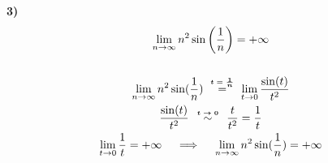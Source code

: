 \documentclass[11pt,reqno]{amsart}
\begin{document}
{\bf 3)}
\begin{gather*}
 \lim_{n \to \infty} n^2 \sin\left(\frac{1}{n}\right) = +\infty\\\\
 \iffalse \text{Osserviamo che} \quad \lim_{x \to 0} \frac{\sin(x)}{x} = 1\\
 \text{quindi} \quad \forall \, \epsilon > 0 \quad \exists \, \overline{n}: \quad \forall \, \frac{1}{n} \leq \overline{n} \quad \left|\frac{\sin(\frac{1}{n})}{\frac{1}{n}} - 1\right| < \epsilon\\
 \implies \quad 1 - \epsilon < \frac{\sin(\frac{1}{n})}{\frac{1}{n}} < 1 + \epsilon\\
 \text{Consideriamo la parte } \textbf{sinistra} \text{ della doppia disuguaglianza, e prendiamo } \epsilon = \frac{1}{2}\\
 \implies \quad \frac{\sin(\frac{1}{n})}{\frac{1}{n}} > \frac{1}{2} \quad \text{per} \quad \frac{1}{n} \leq \overline{n}_{\epsilon = \frac{1}{2}} \quad \left(\text{quindi per } n \geq \frac{1}{\overline{n}_{\epsilon = \frac{1}{2}}} \right)\\
 \frac{\sin(\frac{1}{n})}{\frac{1}{n}} = n\sin\left(\frac{1}{n}\right) \quad \implies \quad n^2\sin\left(\frac{1}{n}\right) > \frac{n}{2} \quad \text{per} \quad n \geq \frac{1}{\overline{n}_{\epsilon = \frac{1}{2}}}\\\\\\
 \text{Supponiamo per } \textbf{assurdo} \text{ che} \quad L = \lim_{n \to \infty} n^2\sin\left(\frac{1}{n}\right) \quad (L \in \mathbb{R})\\
 \text{Per quanto osservato sopra avremo che} \quad n^2\sin\left(\frac{1}{n}\right) > L \quad \forall \, n \geq \max\left(2L, \frac{1}{\overline{n}_{\epsilon = \frac{1}{2}}}\right)\\
 \text{Quindi la successione} \quad n^2\sin\left(\frac{1}{n}\right) \quad \textbf{diverge}\\
 \text{-----------------------------------------------------------------------------}\\
 \fi
 \lim_{n \to \infty} n^2 \sin(\frac{1}{n}) \quad \stackrel{\mathclap{\tiny\mbox{\boldmath$t = \frac{1}{n}$}}}{=} \quad \lim_{t \to 0} \frac{\sin(t)}{t^2}\\
 \frac{\sin(t)}{t^2} \quad \stackrel{\mathclap{\tiny\mbox{\boldmath$t \to 0$}}}{\sim} \quad \frac{t}{t^2} = \frac{1}{t}\\
 \lim_{t \to 0} \frac{1}{t} = +\infty \quad \implies \quad \lim_{n \to \infty} n^2 \sin(\frac{1}{n}) = +\infty
\end{gather*}
\end{document}
